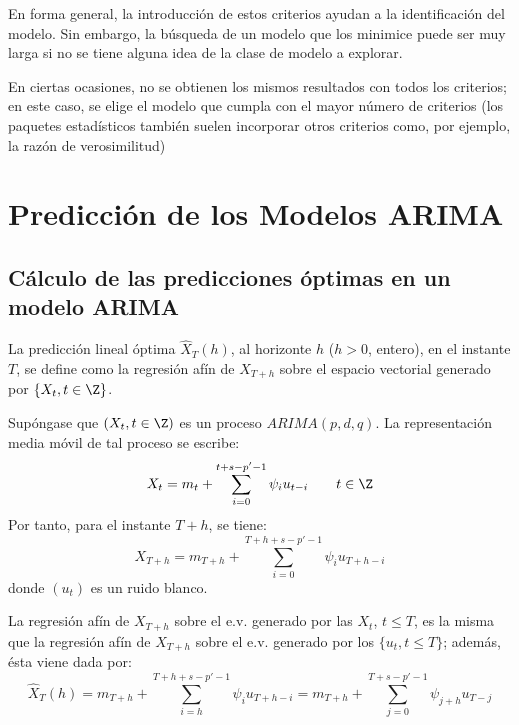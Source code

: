 En forma general, la introducci\'{o}n de estos criterios ayudan a la identificaci\'{o}n del modelo. Sin embargo, la b\'{u}squeda de un modelo que los minimice puede ser muy larga si no se tiene alguna idea de la clase de modelo a explorar.

\begin{observacion}
En ciertas ocasiones, no se obtienen los mismos resultados con todos los criterios; en este caso, se elige el modelo que cumpla con el mayor n\'{u}mero de criterios (los paquetes estad\'{i}sticos tambi\'{e}n suelen incorporar otros criterios como, por ejemplo, la raz\'{o}n de verosimilitud) 
\end{observacion}


\section{Predicci\'{o}n de los Modelos ARIMA}

\subsection{C\'{a}lculo de las predicciones \'{o}ptimas en un modelo ARIMA}

\begin{definicion}
La predicci\'{o}n lineal \'{o}ptima $\widehat{X}_{T} (h)$, al horizonte $h$ ($h>0$, entero), en el instante $T$, se define como la regresi\'{o}n af\'{i}n de $X_{{T+h}}$ sobre el espacio vectorial generado por $\{X_t, t\in \Z\}$.
\end{definicion}

Sup\'{o}ngase que $(X_{t}, t \in \Z)$ es un proceso $ARIMA(p,d,q)$. La representaci\'{o}n media m\'{o}vil de tal proceso se escribe:
\[
X_{t} =m_{t} +\sum_{i=0}^{t+s-p'-1} {\psi_{i} u_{t-i} } \qquad  t\in \Z
\]
Por tanto, para el instante $T+h$, se tiene:
\[
X_{T+h} =m_{T+h} +\sum_{i=0}^{T+h+s-p'-1} {\psi_{i} u_{T+h-i} } 
\]
donde $(u_{t})$ es un ruido blanco.\newline

La regresi\'{o}n af\'{i}n de $X_{{T+h}}$ sobre el e.v. generado por las $X_{t}$, $t\le T$, es la misma que la regresi\'{o}n af\'{i}n de $X_{{T+h}}$ sobre el e.v. generado por los $\{ u_{t} , t \le  T\}$; adem\'{a}s, \'{e}sta viene dada por:
\begin{equation}
\label{eq:3.01}
{\widehat{X}_{T} (h)=m_{T+h} 
+\sum_{i=h}^{T+h+s-p'-1} {\psi_{i} u_{T+h-i} } =m_{T+h} 
+\sum_{j=0}^{T+s-p'-1} {\psi_{j+h} u_{T-j} } }
\end{equation}

